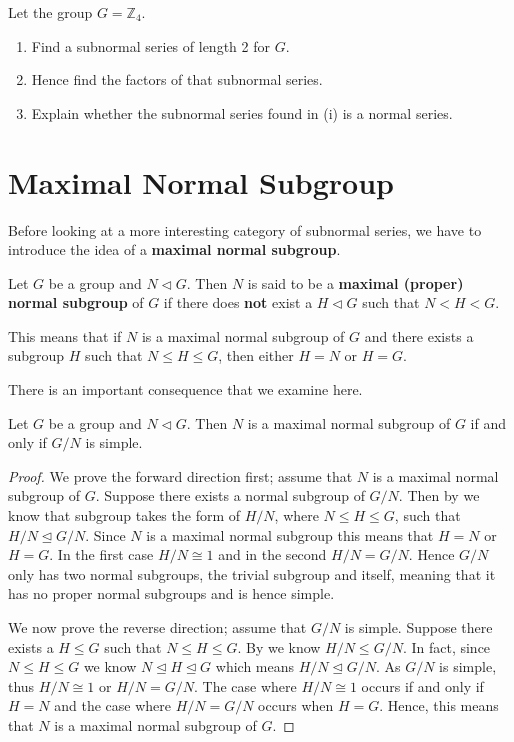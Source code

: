 \begin{exercise}
    Let the group $G = \mathbb{Z}_4$.
    \begin{enumerate}[label=(\roman*)]
        \item Find a subnormal series of length 2 for $G$.
        \item Hence find the factors of that subnormal series.
        \item Explain whether the subnormal series found in (i) is a normal series.
    \end{enumerate}
\end{exercise}

\section{Maximal Normal Subgroup}
Before looking at a more interesting category of subnormal series, we have to introduce the idea of a \textbf{maximal normal subgroup}.
\begin{definition}
    Let $G$ be a group and $N \lhd G$. Then $N$ is said to be a \textbf{maximal (proper) normal subgroup} of $G$ if there does \textbf{not} exist a $H \lhd G$ such that $N < H < G$.
\end{definition}
\begin{remark}
    This means that if $N$ is a maximal normal subgroup of $G$ and there exists a subgroup $H$ such that $N \leq H \leq G$, then either $H = N$ or $H = G$.
\end{remark}

There is an important consequence that we examine here.
\begin{theorem}\label{thrm-maximal-normal-subgroup-iff-quotient-is-simple}
    Let $G$ be a group and $N \lhd G$. Then $N$ is a maximal normal subgroup of $G$ if and only if $G/N$ is simple.
\end{theorem}

\begin{proof}
    We prove the forward direction first; assume that $N$ is a maximal normal subgroup of $G$. Suppose there exists a normal subgroup of $G/N$. Then by  we know that subgroup takes the form of $H/N$, where $N \leq H \leq G$, such that $H/N \unlhd G/N$. Since $N$ is a maximal normal subgroup this means that $H = N$ or $H = G$. In the first case $H/N \cong 1$ and in the second $H / N = G/N$. Hence $G/N$ only has two normal subgroups, the trivial subgroup and itself, meaning that it has no proper normal subgroups and is hence simple.
    
    We now prove the reverse direction; assume that $G/N$ is simple. Suppose there exists a $H \leq G$ such that $N \leq H \leq G$. By  we know $H/N \leq G/N$. In fact, since $N \leq H \leq G$ we know $N \unlhd H \unlhd G$ which means $H/N \unlhd G/N$. As $G/N$ is simple, thus $H/N \cong 1$ or $H/N = G/N$. The case where $H/N \cong 1$ occurs if and only if $H = N$ and the case where $H/N = G/N$ occurs when $H = G$. Hence, this means that $N$ is a maximal normal subgroup of $G$.
\end{proof}

